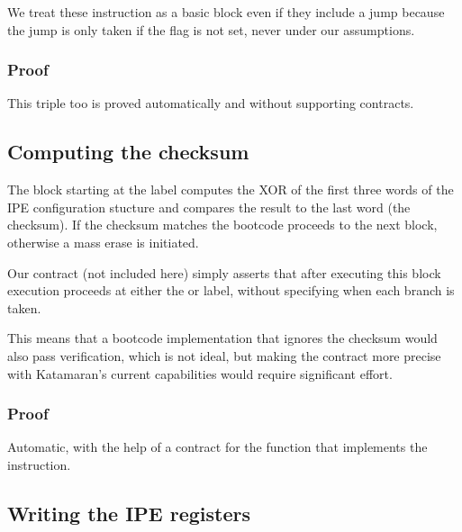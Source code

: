 We treat these instruction as a basic block even if they include a jump because the jump is only taken if the flag is not set, \ie never under our assumptions.

\subsubsection{Proof}

This triple too is proved automatically and without supporting contracts.

\subsection{Computing the checksum}

The block starting at the  label computes the XOR of the first three words of the IPE configuration stucture and compares the result to the last word (the checksum). If the checksum matches the bootcode proceeds to the next block, otherwise a mass erase is initiated.

Our contract (not included here) simply asserts that after executing this block execution proceeds at either the  or  label, without specifying when each branch is taken.

This means that a bootcode implementation that ignores the checksum would also pass verification, which is not ideal, but making the contract more precise with Katamaran's current capabilities would require significant effort.

\subsubsection{Proof}

Automatic, with the help of a contract for the  function that implements the  instruction.

\subsection{Writing the IPE registers}

